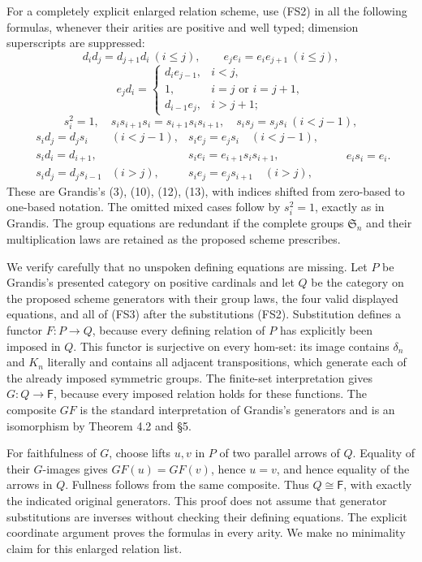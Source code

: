 \documentclass[11pt,a4paper]{article}
\theoremstyle{definition}
\begin{document}
For a completely explicit enlarged relation scheme, use (FS2) in
all the following formulas, whenever their arities are positive and
well typed; dimension superscripts are suppressed:
\[
 d_i d_j=d_{j+1}d_i\ (i\le j),\qquad
 e_j e_i=e_i e_{j+1}\ (i\le j),
\]
\[
 e_jd_i=
 \begin{cases}
 d_i e_{j-1},&i<j,\\
 1,&i=j\text{ or }i=j+1,\\
 d_{i-1}e_j,&i>j+1;
 \end{cases}
\]
\[
 s_i^2=1,\quad s_i s_{i+1}s_i=s_{i+1}s_i s_{i+1},\quad
 s_i s_j=s_j s_i\ (i<j-1),
\]
\[
 \begin{array}{lll}
 s_i d_j=d_j s_i &(i<j-1),&s_i e_j=e_j s_i\quad(i<j-1),\\
 s_i d_i=d_{i+1},&&s_i e_i=e_{i+1}s_i s_{i+1},\\
 s_i d_j=d_j s_{i-1}&(i>j),&s_i e_j=e_j s_{i+1}\quad(i>j),
 \end{array}
 \qquad e_i s_i=e_i.
 \tag{FS3}
\]
These are Grandis's (3), (10), (12), (13), with indices shifted from
zero-based to one-based notation.  The omitted mixed cases follow by
\(s_i^2=1\), exactly as in Grandis.  The group equations are redundant
if the complete groups \(\mathfrak S_n\) and their multiplication laws
are retained as the proposed scheme prescribes.

We verify carefully that no unspoken defining equations are missing.
Let \(P\) be Grandis's presented category on positive cardinals and
let \(Q\) be the category on the proposed scheme generators with their group
laws, the four valid displayed equations, and all of (FS3) after the
substitutions (FS2).  Substitution defines a functor
\(F:P\to Q\), because every defining relation of \(P\) has explicitly
been imposed in \(Q\).  This functor is surjective on every hom-set:
its image contains \(\delta_n\) and \(K_n\) literally and contains all
adjacent transpositions, which generate each of the already imposed
symmetric groups.  The finite-set interpretation gives
\(G:Q\to\mathsf F\), because every imposed relation holds for these
functions.  The composite \(GF\) is the standard interpretation of
Grandis's generators and is an isomorphism by Theorem 4.2 and §5.

For faithfulness of \(G\), choose lifts \(u,v\) in \(P\) of two
parallel arrows of \(Q\).  Equality of their \(G\)-images gives
\(GF(u)=GF(v)\), hence \(u=v\), and hence equality of the arrows in
\(Q\).  Fullness follows from the same composite.  Thus
\(Q\cong\mathsf F\), with exactly the indicated original generators.
This proof does not assume that generator substitutions are inverses
without checking their defining equations.  The explicit coordinate argument proves the formulas in every arity.  We make no
minimality claim for this enlarged relation list.
\end{document}
